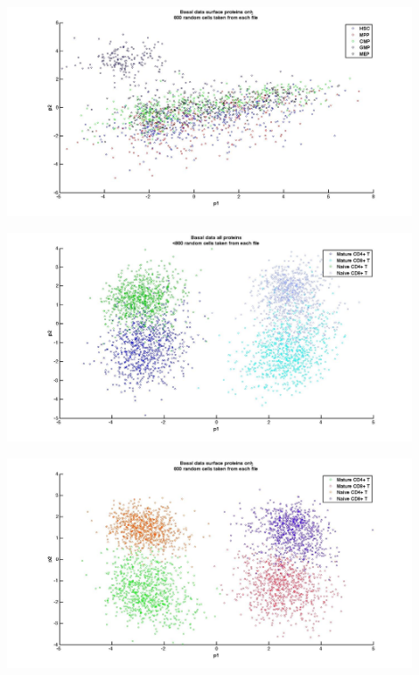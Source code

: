 \documentclass{article} %
\begin{document}
\begin{minipage}{\linewidth}
\centering
  \includegraphics[width=120mm]{Basal_SurfaceProtein_StemCells.jpg}
\end{minipage}


\begin{minipage}{\linewidth}
\centering
  \includegraphics[width=120mm]{Basal_AllProtein_TCells.jpg}
\end{minipage}

\begin{minipage}{\linewidth}
\centering
  \includegraphics[width=120mm]{Basal_SurfaceProtein_TCells.jpg}
\end{minipage}
\end{document}
